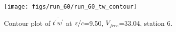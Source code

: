 \begin{figure}[H]
\centering
\texttt{[image: figs/run\_60/run\_60\_tw\_contour]}
\caption{Contour plot of $\overline{t^\prime w^\prime}$ at $z/c$=9.50, $V_{free}$=33.04, station 6.}
\label{fig:run_60_tw_contour}
\end{figure}


